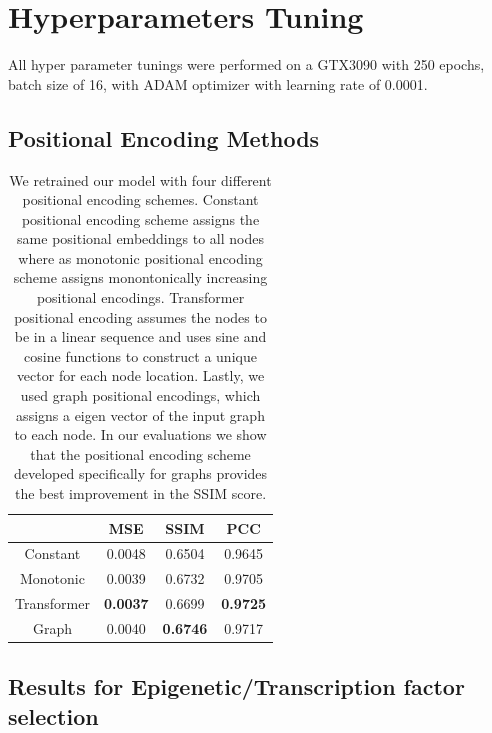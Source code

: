 \section{Hyperparameters Tuning}
\label{supp-section:hyperparameter-tuning}

All hyper parameter tunings were performed on a GTX3090 with 250 epochs, batch size of 16, with ADAM optimizer with learning rate of 0.0001. 

\subsection{Positional Encoding Methods}

\begin{table}[H]
\centering
\begin{tabular}{cccc}
\hline
            & \textbf{MSE}    & \textbf{SSIM}   & \textbf{PCC}    \\ \hline
Constant    & 0.0048          & 0.6504          & 0.9645          \\
Monotonic   & 0.0039          & 0.6732          & 0.9705          \\
Transformer & \textbf{0.0037} & 0.6699          & \textbf{0.9725} \\
Graph       & 0.0040          & \textbf{0.6746} & 0.9717          \\ \hline
\end{tabular}
\caption{
    \label{supp-tab:positional-encodings} We retrained our model with four different positional encoding schemes. Constant positional encoding scheme assigns the same positional embeddings to all nodes where as monotonic positional encoding scheme assigns monontonically increasing positional encodings. Transformer positional encoding assumes the nodes to be in a linear sequence and uses sine and cosine functions to construct a unique vector for each node location. Lastly, we used graph positional encodings, which assigns a eigen vector of the input graph to each node. In our evaluations we show that the positional encoding scheme developed specifically for graphs provides the best improvement in the SSIM score. 
}
\end{table}




\subsection{Results for Epigenetic/Transcription factor selection}

